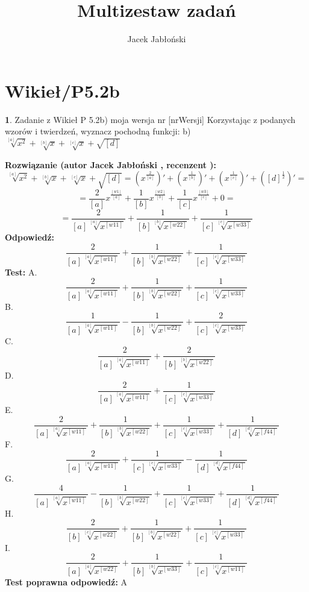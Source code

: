 \documentclass[12pt, a4paper]{article}
\title{Multizestaw zadań}
\author{Jacek Jabłoński}
\date{}
\theoremstyle{definition} %
\newtheorem{zad}{}
\newcommand{\kategoria}[1]{\section{#1}} %
\newcommand{\zadStart}[1]{\begin{zad}#1\newline} %
\newcommand{\zadStop}{\end{zad}}   %
\newcommand{\rozwStart}[2]{\noindent \textbf{Rozwiązanie (autor #1 , recenzent #2): }\newline} %
\newcommand{\rozwStop}{\newline}                                            %
\newcommand{\odpStart}{\noindent \textbf{Odpowiedź:}\newline}    %
\newcommand{\odpStop}{\newline}                                             %
\newcommand{\testStart}{\noindent \textbf{Test:}\newline} %
\newcommand{\testStop}{\newline} %
\newcommand{\kluczStart}{\noindent \textbf{Test poprawna odpowiedź:}\newline} %
\newcommand{\kluczStop}{\newline} %
\begin{document}
\maketitle


\kategoria{Wikieł/P5.2b}
\zadStart{Zadanie z Wikieł P 5.2b) moja wersja nr [nrWersji]}
Korzystając z podanych wzorów i twierdzeń, wyznacz pochodną funkcji:
b) $\sqrt[[a]]{x^2} + \sqrt[[b]]{x} +\sqrt[[c]]{x} + \sqrt{[d]}$
\zadStop
\rozwStart{Jacek Jabłoński}{}
$$\sqrt[[a]]{x^2} + \sqrt[[b]]{x} +\sqrt[[c]]{x} + \sqrt{[d]} = (x^{\frac{2}{[a]}})' + (x^{\frac{1}{[b]}})' + (x^{\frac{1}{[c]}})' +([d]^{\frac{1}{2}})' =$$
$$= \frac{2}{[a]}x^{\frac{[w1]}{[a]}} + \frac{1}{[b]}x^{\frac{[w2]}{[b]}} + \frac{1}{[c]}x^{\frac{[w3]}{[c]}} + 0 =$$
$$= \frac{2}{[a] \sqrt[[a]]{x^{[w11]}}} + \frac{1}{[b] \sqrt[[b]]{x^{[w22]}}} + \frac{1}{[c] \sqrt[[c]]{x^{[w33]}}}$$
\rozwStop
\odpStart
$$\frac{2}{[a] \sqrt[[a]]{x^{[w11]}}} + \frac{1}{[b] \sqrt[[b]]{x^{[w22]}}} + \frac{1}{[c] \sqrt[[c]]{x^{[w33]}}}$$
\odpStop
\testStart
A. $$\frac{2}{[a] \sqrt[[a]]{x^{[w11]}}} + \frac{1}{[b] \sqrt[[b]]{x^{[w22]}}} + \frac{1}{[c] \sqrt[[c]]{x^{[w33]}}}$$
B. $$\frac{1}{[a] \sqrt[[a]]{x^{[w11]}}} - \frac{1}{[b] \sqrt[[b]]{x^{[w22]}}} + \frac{2}{[c] \sqrt[[c]]{x^{[w33]}}}$$
C. $$\frac{2}{[a] \sqrt[[a]]{x^{[w11]}}} + \frac{2}{[b] \sqrt[[b]]{x^{[w22]}}}$$
D. $$\frac{2}{[a] \sqrt[[a]]{x^{[w11]}}} + \frac{1}{[c] \sqrt[[c]]{x^{[w33]}}}$$
E. $$\frac{2}{[a] \sqrt[[a]]{x^{[w11]}}} + \frac{1}{[b] \sqrt[[b]]{x^{[w22]}}} + \frac{1}{[c] \sqrt[[c]]{x^{[w33]}}} + \frac{1}{[d] \sqrt[[d]]{x^{[f44]}}} $$
F. $$\frac{2}{[a] \sqrt[[a]]{x^{[w11]}}} + \frac{1}{[c] \sqrt[[c]]{x^{[w33]}}} - \frac{1}{[d] \sqrt[[d]]{x^{[f44]}}} $$
G. $$\frac{4}{[a] \sqrt[[a]]{x^{[w11]}}} - \frac{1}{[b] \sqrt[[b]]{x^{[w22]}}} + \frac{1}{[c] \sqrt[[c]]{x^{[w33]}}} + \frac{1}{[d] \sqrt[[d]]{x^{[f44]}}} $$
H. $$\frac{2}{[b] \sqrt[[c]]{x^{[w22]}}} + \frac{1}{[b] \sqrt[[b]]{x^{[w22]}}} + \frac{1}{[c] \sqrt[[c]]{x^{[w33]}}}$$
I. $$\frac{2}{[a] \sqrt[[a]]{x^{[w22]}}} + \frac{1}{[b] \sqrt[[b]]{x^{[w33]}}} + \frac{1}{[c] \sqrt[[c]]{x^{[w11]}}}$$
\testStop
\kluczStart
A
\kluczStop
\end{document}
